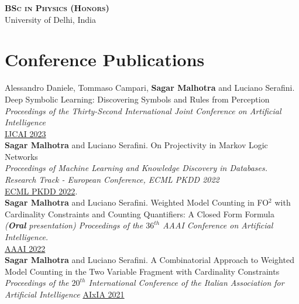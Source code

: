 \documentclass[10pt, a4paper]{article}
\newcommand{\years}[1]{\marginnote{\scriptsize #1}}
\begin{document}
\years{2012-2015}\textsc{\textbf{BSc in Physics (Honors)}}\\
University of Delhi, India




\section*{Conference Publications}

\years{2023}Alessandro Daniele, Tommaso Campari, \textbf{Sagar Malhotra} and Luciano Serafini. \\ Deep Symbolic Learning: Discovering Symbols and Rules from Perception \\ 
\emph{Proceedings of the Thirty-Second International Joint Conference on Artificial Intelligence}\\
\href{https://www.ijcai.org/proceedings/2023/400}{IJCAI 2023}\\ 

\years{2022}\textbf{Sagar Malhotra} and Luciano Serafini. On Projectivity in Markov Logic Networks \\ \emph{Proceedings of Machine Learning and Knowledge Discovery in Databases. Research Track - European Conference, ECML PKDD 2022} \\  
\href{https://link.springer.com/chapter/10.1007/978-3-031-26419-1_14}{ECML PKDD 2022}.\\ 

\years{2022}\textbf{Sagar Malhotra} and Luciano Serafini. Weighted Model Counting in FO$^2$ with Cardinality Constraints and Counting Quantifiers: A Closed Form Formula \\ \emph{(\textbf{Oral} presentation) Proceedings of the $36^{th}$ AAAI Conference on Artificial Intelligence.}\\
\href{https://ojs.aaai.org/index.php/AAAI/article/view/20525}{AAAI 2022} \\

\years{2021}\textbf{Sagar Malhotra} and Luciano Serafini. A Combinatorial Approach to Weighted Model Counting in the Two Variable Fragment with Cardinality Constraints\\ \emph{ Proceedings of the $20^{th}$ International Conference of the Italian Association for Artificial Intelligence}
\href{https://link.springer.com/chapter/10.1007/978-3-031-08421-8_10}{AIxIA 2021}
\end{document}
